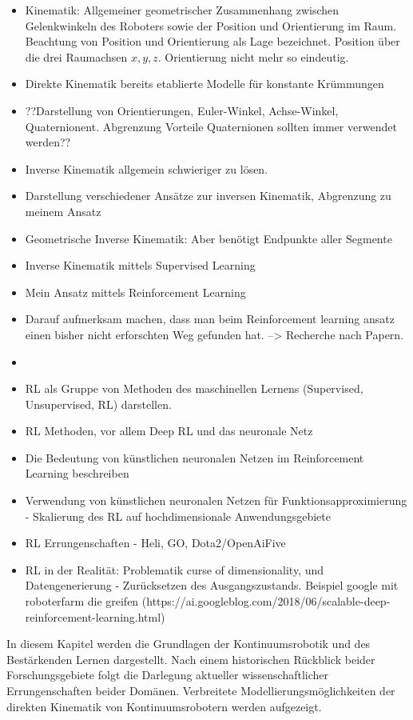 \begin{itemize}
\item Kinematik: Allgemeiner geometrischer Zusammenhang zwischen Gelenkwinkeln des Roboters sowie der Position und Orientierung im Raum. Beachtung von Position und Orientierung als Lage bezeichnet. Position über die drei Raumachsen $x, y, z$. Orientierung nicht mehr so eindeutig.
\item Direkte Kinematik bereits etablierte Modelle für konstante Krümmungen
\item ??Darstellung von Orientierungen, Euler-Winkel, Achse-Winkel, Quaternionent. Abgrenzung Vorteile Quaternionen sollten immer verwendet werden??
\item Inverse Kinematik allgemein schwieriger zu lösen. 
\item Darstellung verschiedener Ansätze zur inversen Kinematik, Abgrenzung zu meinem Ansatz
\item Geometrische Inverse Kinematik: Aber benötigt Endpunkte aller Segmente
\item Inverse Kinematik mittels Supervised Learning
\item Mein Ansatz mittels Reinforcement Learning
\item Darauf aufmerksam machen, dass man beim Reinforcement learning ansatz einen bisher nicht erforschten Weg gefunden hat. --> Recherche nach Papern. 
\\
\item 
\item RL als Gruppe von Methoden des maschinellen Lernens (Supervised, Unsupervised, RL) darstellen. 
\item RL Methoden, vor allem Deep RL und das neuronale Netz
\item Die Bedeutung von künstlichen neuronalen Netzen im Reinforcement Learning beschreiben
\item Verwendung von künstlichen neuronalen Netzen für Funktionsapproximierung - Skalierung des RL auf hochdimensionale Anwendungsgebiete
\item RL Errungenschaften - Heli, GO, Dota2/OpenAiFive
\item RL in der Realität: Problematik curse of dimensionality, und Datengenerierung - Zurücksetzen des Ausgangszustands. Beispiel google mit roboterfarm die greifen (https://ai.googleblog.com/2018/06/scalable-deep-reinforcement-learning.html) 

\end{itemize}

In diesem Kapitel werden die Grundlagen der Kontinuumsrobotik und des Bestärkenden Lernen dargestellt. Nach einem historischen Rückblick beider Forschungsgebiete folgt die Darlegung aktueller wissenschaftlicher Errungenschaften beider Domänen. Verbreitete Modellierungsmöglichkeiten der direkten Kinematik von Kontinuumsrobotern werden aufgezeigt.